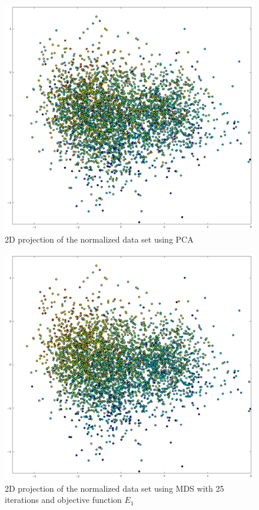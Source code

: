 \documentclass{report}
\begin{document}
\begin{figure}[H]
\includegraphics[width=\textwidth]{pca.png}
\caption{2D projection of the normalized data set using PCA}\end{figure}
\label{pca}
\begin{figure}[H]
\includegraphics[width=\textwidth]{mds.png}
\caption{2D projection of the normalized data set using MDS with 25 iterations and objective function $E_1$}
\label{mds}
\end{figure}
\end{document}
